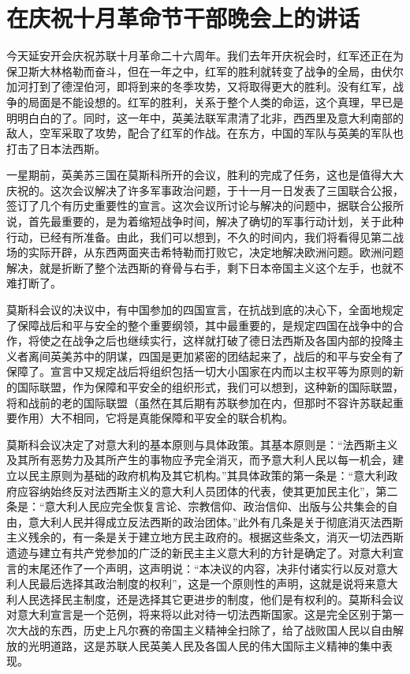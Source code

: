 \section[在庆祝十月革命节干部晚会上的讲话（一九四三年十一月七日）]{在庆祝十月革命节干部晚会上的讲话}


今天延安开会庆祝苏联十月革命二十六周年。我们去年开庆祝会时，红军还正在为保卫斯大林格勒而奋斗，但在一年之中，红军的胜利就转变了战争的全局，由伏尔加河打到了德涅伯河，即将到来的冬季攻势，又将取得更大的胜利。没有红军，战争的局面是不能设想的。红军的胜利，关系于整个人类的命运，这个真理，早已是明明白白的了。同时，这一年中，英美法联军肃清了北非，西西里及意大利南部的敌人，空军采取了攻势，配合了红军的作战。在东方，中国的军队与英美的军队也打击了日本法西斯。

一星期前，英美苏三国在莫斯科所开的会议，胜利的完成了任务，这也是值得大大庆祝的。这次会议解决了许多军事政治问题，于十一月一日发表了三国联合公报，签订了几个有历史重要性的宣言。这次会议所讨论与解决的问题中，据联合公报所说，首先最重要的，是为着缩短战争时间，解决了确切的军事行动计划，关于此种行动，已经有所准备。由此，我们可以想到，不久的时间内，我们将看得见第二战场的实际开辟，从东西两面夹击希特勒而打败它，决定地解决欧洲问题。欧洲问题解决，就是折断了整个法西斯的脊骨与右手，剩下日本帝国主义这个左手，也就不难打断了。

莫斯科会议的决议中，有中国参加的四国宣言，在抗战到底的决心下，全面地规定了保障战后和平与安全的整个重要纲领，其中最重要的，是规定四国在战争中的合作，将使之在战争之后也继续实行，这样就打破了德日法西斯及各国内部的投降主义者离间英美苏中的阴谋，四国是更加紧密的团结起来了，战后的和平与安全有了保障了。宣言中又规定战后将组织包括一切大小国家在内而以主权平等为原则的新的国际联盟，作为保障和平安全的组织形式，我们可以想到，这种新的国际联盟，将和战前的老的国际联盟（虽然在其后期有苏联参加在内，但那时不容许苏联起重要作用）大不相同，它将是真能保障和平安全的联合机构。

莫斯科会议决定了对意大利的基本原则与具体政策。其基本原则是：“法西斯主义及其所有恶势力及其所产生的事物应予完全消灭，而予意大利人民以每一机会，建立以民主原则为基础的政府机构及其它机构。”其具体政策的第一条是：“意大利政府应容纳始终反对法西斯主义的意大利人员团体的代表，使其更加民主化”，第二条是：“意大利人民应完全恢复言论、宗教信仰、政治信仰、出版与公共集会的自由，意大利人民并得成立反法西斯的政治团体。”此外有几条是关于彻底消灭法西斯主义残余的，有一条是关于建立地方民主政府的。根据这些条文，消灭一切法西斯遗迹与建立有共产党参加的广泛的新民主主义意大利的方针是确定了。对意大利宣言的末尾还作了一个声明，这声明说：“本决议的内容，决非付诸实行以反对意大利人民最后选择其政治制度的权利”，这是一个原则性的声明，这就是说将来意大利人民选择民主制度，还是选择其它更进步的制度，他们是有权利的。莫斯科会议对意大利宣言是一个范例，将来将以此对待一切法西斯国家。这是完全区别于第一次大战的东西，历史上凡尔赛的帝国主义精神全扫除了，给了战败国人民以自由解放的光明道路，这是苏联人民英美人民及各国人民的伟大国际主义精神的集中表现。

